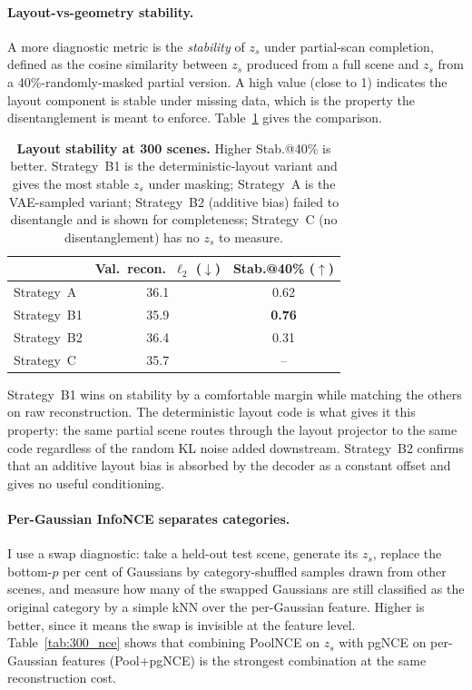 \paragraph{Layout-vs-geometry stability.} A more diagnostic metric is the \emph{stability} of $z_s$ under partial-scan completion, defined as the cosine similarity between $z_s$ produced from a full scene and $z_s$ from a 40\%-randomly-masked partial version. A high value (close to 1) indicates the layout component is stable under missing data, which is the property the disentanglement is meant to enforce. Table~\ref{tab:300_disentangle} gives the comparison.

\begin{table}[h]
  \centering
  \caption[300-scene latent disentanglement comparison]{\textbf{Layout stability at 300 scenes.} Higher Stab.@40\% is better. Strategy~B1 is the deterministic-layout variant and gives the most stable $z_s$ under masking; Strategy~A is the VAE-sampled variant; Strategy~B2 (additive bias) failed to disentangle and is shown for completeness; Strategy~C (no disentanglement) has no $z_s$ to measure.}
  \label{tab:300_disentangle}
  {\small
  \begin{tabular}{lcc}
    \toprule
                     & Val.\ recon.\ $\ell_2$ ($\downarrow$) & Stab.@40\% ($\uparrow$) \\
    \midrule
    Strategy~A       & 36.1 & 0.62 \\
    Strategy~B1      & 35.9 & \textbf{0.76} \\
    Strategy~B2      & 36.4 & 0.31 \\
    Strategy~C       & 35.7 & --   \\
    \bottomrule
  \end{tabular}}
\end{table}

Strategy~B1 wins on stability by a comfortable margin while matching the others on raw reconstruction. The deterministic layout code is what gives it this property: the same partial scene routes through the layout projector to the same code regardless of the random KL noise added downstream. Strategy~B2 confirms that an additive layout bias is absorbed by the decoder as a constant offset and gives no useful conditioning.

\paragraph{Per-Gaussian InfoNCE separates categories.} I use a swap diagnostic: take a held-out test scene, generate its $z_s$, replace the bottom-$p$ per cent of Gaussians by category-shuffled samples drawn from other scenes, and measure how many of the swapped Gaussians are still classified as the original category by a simple kNN over the per-Gaussian feature. Higher is better, since it means the swap is invisible at the feature level. Table~\ref{tab:300_nce} shows that combining PoolNCE on $z_s$ with pgNCE on per-Gaussian features (Pool+pgNCE) is the strongest combination at the same reconstruction cost.

